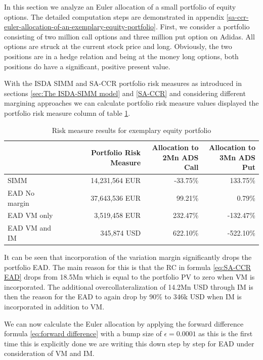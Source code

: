 \documentclass[../Thesis_AHoecherl.tex]{subfiles}
\begin{document}
    In this section we analyze an Euler allocation of a small portfolio of equity options. The detailed computation steps are demonstrated in appendix \ref{sa-ccr-euler-allocation-of-an-exemplary-equity-portfolio}. 
    First, we consider a portfolio consisting of two million call options and three million put option on Adidas. All options are struck at the current stock price and long. Obviously, the two positions are in a hedge relation and being at the money long options, both positions do have a significant, positive present value. 
    
    With the \gls{ISDA SIMM} and \gls{SA-CCR} portfolio risk measures as introduced in sections \ref{sec:The ISDA-SIMM model} and \ref{SA-CCR} and considering different margining approaches we can calculate portfolio risk measure values displayed the portfolio risk measure column of table \ref{tab:2TradeEquityResults}.
    \begin{table}[htbp]
        \centering
        \begin{tabular}{l||r|r|r}
            & Portfolio Risk Measure & \makecell{Allocation to \\ 2Mn ADS Call} & \makecell{Allocation to \\ 3Mn ADS Put} \\
                \toprule
        SIMM  & 14,231,564 EUR & -33.75\% & 133.75\%  \\
        \gls{EAD} No margin & 37,643,536 EUR & 99.21\% & 0.79\%  \\
        \gls{EAD} \gls{VM} only & 3,519,458 EUR & 232.47\% & -132.47\%  \\
        \gls{EAD} \gls{VM} and \gls{IM} & 345,874 USD  & 622.10\% & -522.10\% \\
        \end{tabular}%
        \caption{Risk measure results for exemplary equity portfolio}
        \label{tab:2TradeEquityResults}%
    \end{table}%
    It can be seen that incorporation of the variation margin significantly drops the portfolio EAD. The main reason for this is that the RC in formula \ref{eq:SA-CCR EAD} drops from 18.5Mn which is equal to the portfolio \gls{PV} to zero when \gls{VM} is incorporated.
    The additional overcollateralization of 14.2Mn USD through \gls{IM} is then the reason for the \gls{EAD} to again drop by 90\% to 346k USD when \gls{IM} is incorporated in addition to \gls{VM}.

    We can now calculate the Euler allocation by applying the forward difference formula \ref{eq:forward difference} with a bump size of $\epsilon = 0.0001$ as this is the first time this is explicitly done we are writing this down step by step for \gls{EAD} under consideration of \gls{VM} and IM.
\end{document}
